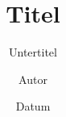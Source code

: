 %
%

\titlehead{Kopf}
\subject{Typisierung}
\title{Titel}
\subtitle{Untertitel}
\author{Autor}
\date{Datum}
\publishers{Verlag}


%


%





\maketitle

